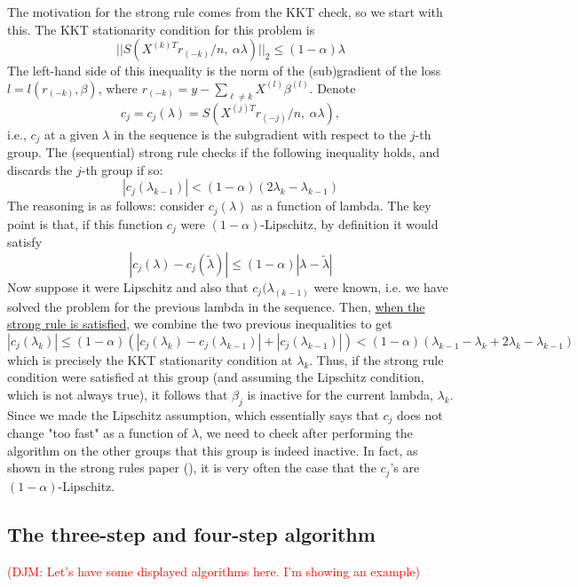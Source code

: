 \documentclass[titlepage]{article}
\newcommand{\djm}[1]{\textcolor{red}{(DJM: #1)}}
\begin{document}
The motivation for the strong rule comes from the KKT check, so we start with this. The KKT stationarity condition for this problem is 
\[
||S(X^{(k)T}r_{(-k)}/n,\ \alpha\lambda)||_2 \leq (1-\alpha)\lambda
\]
The left-hand side of this inequality is the norm of the (sub)gradient of the loss $l = l(r_{(-k)},\beta)$, where $r_{(-k)}= y - \sum_{\ell \neq k} X^{(l)}\beta^{(l)}$.
Denote 
\[
c_j = c_j(\lambda) = S(X^{(j)T}r_{(-j)}/n,\ \alpha\lambda),
\]
i.e., $c_j$ at a given $\lambda$ in the sequence is the subgradient with respect to the $j$-th group.
The (sequential) strong rule checks if the following inequality holds, and discards the $j$-th group if so:
\[
|c_j(\lambda_{k-1})| < (1-\alpha)(2\lambda_k - \lambda_{k-1})
\]
The reasoning is as follows: consider $c_j(\lambda)$ as a function of lambda. The key point is that, if this function $c_j$ were $(1-\alpha)$-Lipschitz, by definition it would satisfy
\[
|c_j(\lambda) - c_j(\tilde{\lambda})|\leq (1-\alpha)|\lambda-\tilde{\lambda}|
\]
Now suppose it were Lipschitz and also that $c_j(\lambda_{(k-1)}$ were known, i.e. we have solved the problem for the previous lambda in the sequence. Then, \underline{when the strong rule is satisfied}, we combine the two previous inequalities to get
\[
|c_j(\lambda_k)|\leq (1-\alpha)(|c_j(\lambda_k) - c_j(\lambda_{k-1})|+|c_j(\lambda_{k-1})|)<(1-\alpha)(\lambda_{k-1}-\lambda_k+2\lambda_{k}-\lambda_{k-1})
\]
which is precisely the KKT stationarity condition at $\lambda_k$. Thus, if the strong rule condition were satisfied at this group (and assuming the Lipschitz condition, which is not always true), it follows that $\beta_j$ is inactive for the current lambda, $\lambda_k$. Since we made the Lipschitz assumption, which essentially says that $c_j$ does not change "too fast" as a function of $\lambda$, we need to check after performing the algorithm on the other groups that this group is indeed inactive. In fact, as shown in the strong rules paper (), it is very often the case that the $c_j$'s are $(1-\alpha)$-Lipschitz.

\subsection{The three-step and four-step algorithm}

\djm{Let's have some displayed algorithms here. I'm showing an example}
\end{document}
